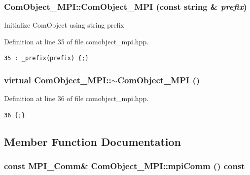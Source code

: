 \subsubsection{\setlength{\rightskip}{0pt plus 5cm}Com\-Object\_\-MPI::Com\-Object\_\-MPI (const string \& {\em prefix})\hspace{0.3cm}{\tt  [inline]}}\label{classComObject__MPI_77766478bbb936b1c62d5dc2dadd6788_77766478bbb936b1c62d5dc2dadd6788}


Initialize Com\-Object using string prefix 

Definition at line 35 of file comobject\_\-mpi.hpp.

\footnotesize\begin{verbatim}35 : _prefix(prefix) {;}
\end{verbatim}\normalsize 


\subsubsection{\setlength{\rightskip}{0pt plus 5cm}virtual Com\-Object\_\-MPI::$\sim$Com\-Object\_\-MPI ()\hspace{0.3cm}{\tt  [inline, virtual]}}\label{classComObject__MPI_b2929ed911fe3ec837f9654ff26a4249_b2929ed911fe3ec837f9654ff26a4249}




Definition at line 36 of file comobject\_\-mpi.hpp.

\footnotesize\begin{verbatim}36 {;}
\end{verbatim}\normalsize 




\subsection{Member Function Documentation}
\subsubsection{\setlength{\rightskip}{0pt plus 5cm}const MPI\_\-Comm\& Com\-Object\_\-MPI::mpi\-Comm () const\hspace{0.3cm}{\tt  [inline]}}\label{classComObject__MPI_dcb2a13b1c9df08fe9bc759bcfdb150e_dcb2a13b1c9df08fe9bc759bcfdb150e}


